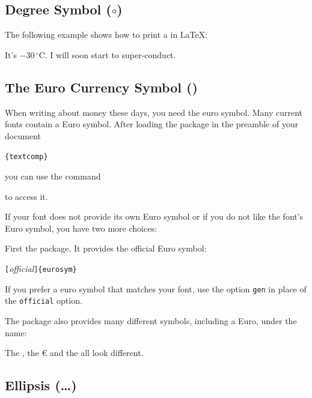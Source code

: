 \subsection{Degree Symbol \texorpdfstring{($\circ$)}{}}

The following example shows how to print a  in \LaTeX{}:

\begin{example}
It's $-30\,^{\circ}\mathrm{C}$.
I will soon start to
super-conduct.
\end{example}

\subsection{The Euro Currency Symbol \texorpdfstring{(\EUR)}{}}

When writing about money these days, you need the euro symbol. Many current
fonts contain a Euro symbol. After loading the  package in the preamble of your document
\begin{lscommand}
\verb|{textcomp}| 
\end{lscommand}
you can use the command
\begin{lscommand}
\end{lscommand}
to access it.

If your font does not provide its own Euro symbol or if you do not like the font's Euro symbol, you have two more choices:

First the  package. It provides the official Euro symbol:
\begin{lscommand}
\verb|[|\emph{official}\verb|]{eurosym}| 
\end{lscommand}
If you prefer a euro symbol that matches your font, use the option
\texttt{gen} in place of the \texttt{official} option.

The  package also provides many different symbols,
including a Euro, under the name:
\begin{lscommand}
\end{lscommand}

\begin{example}
The \texteuro{}, the \euro{}
and the \EUR{} all look
different.
\end{example} 

\subsection{Ellipsis (\texorpdfstring{\ldots}{...})}

